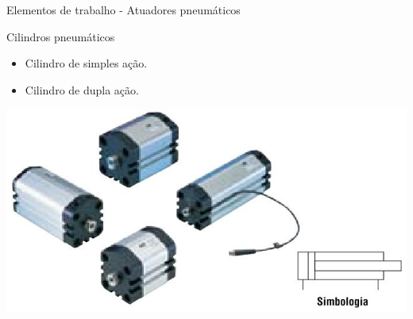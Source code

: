 \begin{frame}{Elementos de trabalho - Atuadores pneumáticos}
	\begin{block}{Cilindros pneumáticos}
		\begin{itemize}
			\item Cilindro de simples ação.
			\item Cilindro de dupla ação.
		\end{itemize}
	\end{block}
	
	\medskip
	
	\centering
	\includegraphics[width=0.7\linewidth]{Figuras/Ch14/fig30}
	
\end{frame}


